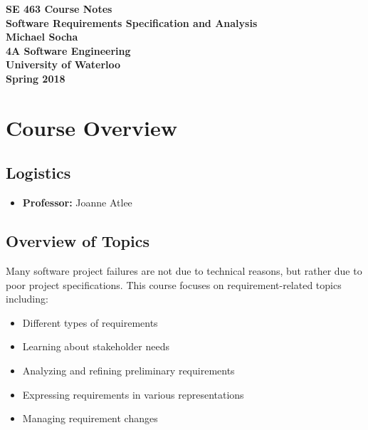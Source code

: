 \documentclass[12pt,titlepage]{article}
\let\stdsection\section
\renewcommand\section{\clearpage\stdsection}
\begin{document}
  \begin{titlepage}
    \vspace*{\fill}
    \centering

    \textbf{\Huge SE 463 Course Notes} \\ [0.4em]
    \textbf{\Large Software Requirements Specification and Analysis} \\ [1em]
    \textbf{\Large Michael Socha} \\ [1em]
    \textbf{\large 4A Software Engineering} \\
    \textbf{\large University of Waterloo} \\
    \textbf{\large Spring 2018} \\
    \vspace*{\fill}
  \end{titlepage}

  \newpage 


  \tableofcontents

  \newpage


  \section{Course Overview}
    \subsection{Logistics}
      \begin{itemize}
        \item \textbf{Professor:} Joanne Atlee
      \end{itemize}

    \subsection{Overview of Topics}
      Many software project failures are not due to technical reasons, but rather due to poor project specifications. This course
      focuses on requirement-related topics including:
      \begin{itemize}
        \item Different types of requirements
        \item Learning about stakeholder needs
        \item Analyzing and refining preliminary requirements
        \item Expressing requirements in various representations
        \item Managing requirement changes
      \end{itemize}
\end{document}
